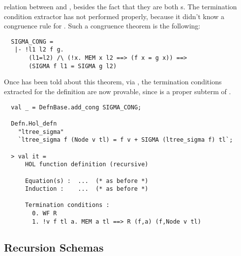 relation between  and , besides the fact
that they are both s. The termination condition extractor
has not performed properly, because it didn't know a congruence rule
for . Such a congruence theorem is the following:
%
\begin{hol}
\begin{verbatim}
  SIGMA_CONG =
   |- !l1 l2 f g.
       (l1=l2) /\ (!x. MEM x l2 ==> (f x = g x)) ==>
       (SIGMA f l1 = SIGMA g l2)
\end{verbatim}
\end{hol}
%
Once  has been told about this theorem, via
, the termination conditions extracted for
the definition are now provable, since  is a
proper subterm of .
%
\begin{session}
\begin{hol}
\begin{verbatim}
  val _ = DefnBase.add_cong SIGMA_CONG;

  Defn.Hol_defn
    "ltree_sigma"
    `ltree_sigma f (Node v tl) = f v + SIGMA (ltree_sigma f) tl`;

  > val it =
      HOL function definition (recursive)

      Equation(s) :  ...  (* as before *)
      Induction :    ...  (* as before *)

      Termination conditions :
        0. WF R
        1. !v f tl a. MEM a tl ==> R (f,a) (f,Node v tl)
\end{verbatim}
\end{hol}
\end{session}

\subsection{Recursion Schemas}

